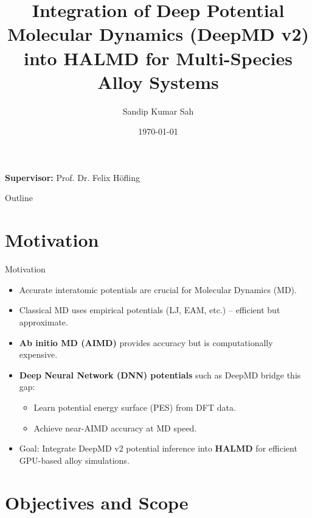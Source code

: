 \documentclass[aspectratio=169]{beamer}
\title[DeepMD–HALMD Integration]{Integration of Deep Potential Molecular Dynamics (DeepMD v2) into HALMD for Multi-Species Alloy Systems}
\author{Sandip Kumar Sah}
\institute[Universidade de Lisboa]{M.Sc. Computational Science, Freie Universität Berlin }
\date{\today}
\begin{document}
\begin{frame}
  \titlepage
  \vspace{1cm}
  \begin{center}
    \large \textbf{Supervisor:} Prof. Dr. Felix Höfling
  \end{center}
\end{frame}

\begin{frame}{Outline}
\tableofcontents
\end{frame}

\section{Motivation}

\begin{frame}{Motivation}
\begin{itemize}
    \item Accurate interatomic potentials are crucial for Molecular Dynamics (MD).
    \item Classical MD uses empirical potentials (LJ, EAM, etc.) – efficient but approximate.
    \item \textbf{Ab initio MD (AIMD)} provides accuracy but is computationally expensive.
    \item \textbf{Deep Neural Network (DNN) potentials} such as DeepMD bridge this gap:
    \begin{itemize}
        \item Learn potential energy surface (PES) from DFT data.
        \item Achieve near-AIMD accuracy at MD speed.
    \end{itemize}
    \item Goal: Integrate DeepMD v2 potential inference into \textbf{HALMD} for efficient GPU-based alloy simulations.
\end{itemize}
\end{frame}

\section{Objectives and Scope}
\end{document}
